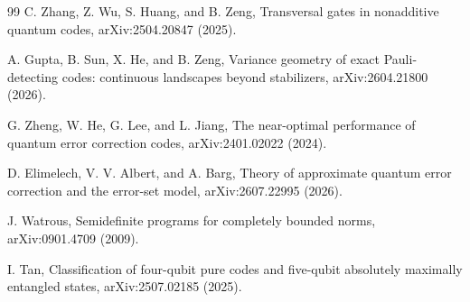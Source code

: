 \documentclass[11pt]{article}
\theoremstyle{definition}
\newcommand{\1}{\mathbf 1}
\begin{document}
\begin{thebibliography}{99}
C. Zhang, Z. Wu, S. Huang, and B. Zeng,
\newblock Transversal gates in nonadditive quantum codes,
\newblock arXiv:2504.20847 (2025).


A. Gupta, B. Sun, X. He, and B. Zeng,
\newblock Variance geometry of exact Pauli-detecting codes: continuous landscapes beyond stabilizers,
\newblock arXiv:2604.21800 (2026).

G. Zheng, W. He, G. Lee, and L. Jiang,
\newblock The near-optimal performance of quantum error correction codes,
\newblock arXiv:2401.02022 (2024).

D. Elimelech, V. V. Albert, and A. Barg,
\newblock Theory of approximate quantum error correction and the error-set model,
\newblock arXiv:2607.22995 (2026).

J. Watrous,
\newblock Semidefinite programs for completely bounded norms,
\newblock arXiv:0901.4709 (2009).

I. Tan,
\newblock Classification of four-qubit pure codes and five-qubit absolutely maximally entangled states,
\newblock arXiv:2507.02185 (2025).

\end{thebibliography}
\end{document}
